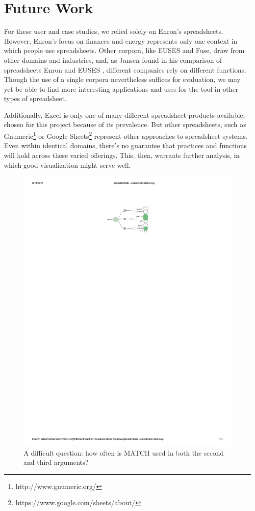 \documentclass[conference]{IEEEtran}
\begin{document}
	\section{Future Work} For these user and case studies, we relied solely on
	Enron's spreadsheets. However, Enron's focus on finances and energy represents
	only one context in which people use spreadsheets. Other corpora, like EUSES
	and Fuse, draw from other domains and industries, and, as Jansen found in his
	comparison of spreadsheets Enron and EUSES \cite{jansen2015enron}, different
	companies rely on different functions. Though the use of a single corpora
	nevertheless suffices for evaluation, we may yet be able to find more
	interesting applications and uses for the tool in other types of spreadsheet.
	\par
	
	Additionally, Excel is only one of many different spreadsheet products
	available, chosen for this project because of its prevalence. But other
	spreadsheets, such as Gnumeric\footnote{http://www.gnumeric.org/} or Google
	Sheets\footnote{https://www.google.com/sheets/about/} represent other
	approaches to spreadsheet systems. Even within identical domains, there's no
	guarantee that practices and functions will hold across these varied offerings.
	This, then, warrants further analysis, in which good visualization might serve
	well. \par
	
	\begin{figure} \centering \includegraphics[width=.4\textwidth]{index}
		\caption{A difficult question: how often is MATCH used in both the second and
			third arguments?} \label{fig:index} \end{figure}
	
\end{document}
